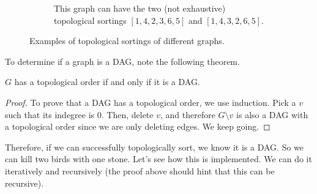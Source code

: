 \begin{definition}
\begin{figure}[H]
\begin{subfigure}[b]{0.48\textwidth}
        \caption{This graph can have the two (not exhaustive) topological sortings $[1, 4, 2, 3, 6, 5]$ and $[1, 4, 3, 2, 6, 5]$.}
        \label{fig:top_sort_unique}
      \end{subfigure}
      \caption{Examples of topological sortings of different graphs. }
      \label{fig:top_sort}
    \end{figure}
  \end{definition}

  To determine if a graph is a DAG, note the following theorem. 

  \begin{theorem}
    $G$ has a topological order if and only if it is a DAG. 
  \end{theorem}
  \begin{proof}
    To prove that a DAG has a topological order, we use induction. Pick a $v$ such that its indegree is $0$. Then, delete $v$, and therefore $G \setminus v$ is also a DAG with a topological order since we are only deleting edges. We keep going. 
  \end{proof}

  Therefore, if we can successfully topologically sort, we know it is a DAG. So we can kill two birds with one stone. Let's see how this is implemented. We can do it iteratively and recursively (the proof above should hint that this can be recursive). 

